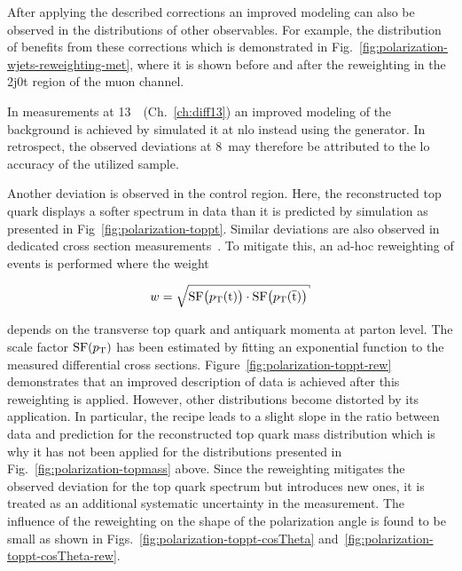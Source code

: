 After applying the described \wjets corrections an improved modeling can also be observed in the distributions of other observables. For example, the distribution of \met benefits from these corrections which is demonstrated in Fig.~\ref{fig:polarization-wjets-reweighting-met}, where it is shown before and after the reweighting in the 2j0t region of the muon channel.


In measurements at 13~\TeV~(Ch.~\ref{ch:diff13}) an improved modeling of the \wjets background is achieved by simulated it at \gls{nlo} instead using the \MGAMC generator. In retrospect, the observed deviations at 8~\TeV may therefore be attributed to the \gls{lo} accuracy of the utilized \MG \wjets sample.

Another deviation is observed in the \ttbar control region. Here, the reconstructed top quark \pt displays a softer spectrum in data than it is predicted by simulation as presented in Fig~\ref{fig:polarization-toppt}. Similar deviations are also observed in dedicated \ttbar cross section measurements~\cite{Chatrchyan:2012saa,Khachatryan:2015oqa}. To mitigate this, an ad-hoc reweighting of \ttbar events is performed where the weight

\begin{equation}
w=\sqrt{\mathrm{SF}\big(\pt(\mathrm{t})\big)\cdot\mathrm{SF}\big(\pt(\bar{\mathrm{t}})\big)}
\end{equation} 

depends on the transverse top quark and antiquark momenta at parton level. The scale factor $\mathrm{SF}(p_\textrm{T})$ has been estimated by fitting an exponential function to the measured differential \ttbar cross sections. Figure~\ref{fig:polarization-toppt-rew} demonstrates that an improved description of data is achieved after this reweighting is applied. However, other distributions become distorted by its application. In particular, the recipe leads to a slight slope in the ratio between data and prediction for the reconstructed top quark mass distribution which is why it has not been applied for the distributions presented in Fig.~\ref{fig:polarization-topmass} above. Since the reweighting mitigates the observed deviation for the top quark \pt spectrum but introduces new ones, it is treated as an additional systematic uncertainty in the measurement. The influence of the reweighting on the shape of the polarization angle is found to be small as shown in Figs.~\ref{fig:polarization-toppt-cosTheta} and~\ref{fig:polarization-toppt-cosTheta-rew}.

